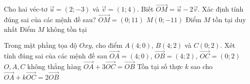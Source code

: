 

\begin{ex}%
	Cho hai véc-tơ $ \overrightarrow{u}=(2;-3) $ và $ \overrightarrow{v}=(1;4) $. Biết $\overrightarrow{OM}= \overrightarrow{u}-2\overrightarrow{v}$. Xác định tính đúng sai của  các mệnh đề sau?
	 \choiceTF
		 {$\overrightarrow{OM}=(0;11)$}
		{\True  $M(0;-11)$}
		{\True Điểm $M$ tồn tại duy  nhất}
		{Điểm $M$ không tồn tại} 
\end{ex}

\begin{ex}%
	Trong mặt phẳng tọa độ $Oxy$, cho điểm $A(4;0)$, $B(4;2)$ và $C(0;2)$. Xét tính đúng sai của các mệnh đề sau 
	 \choiceTF
		{\True  $\overrightarrow{OA}=(4;0)$, $\overrightarrow{OB}=(4;2)$, $\overrightarrow{OC}=(0;2)$}
		{\True $O, A, C$  không thẳng hàng}
		{$\overrightarrow{OA}+3\overrightarrow{OC}= \overrightarrow{OB}$} 
		{\True  Tồn tại số thực $k$ sao cho $\overrightarrow{OA}+k\overrightarrow{OC}= 2\overrightarrow{OB}$}
\end{ex}

